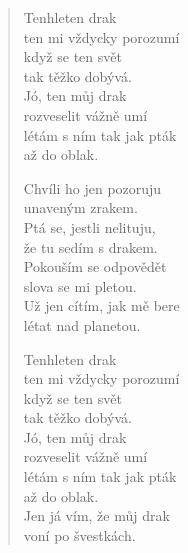 \begin{multicols}{3}
\begin{verse}
Tenhleten drak\\
ten mi vždycky porozumí\\
když se ten svět\\
tak těžko dobývá.\\
Jó, ten můj drak\\
rozveselit vážně umí\\
létám s ním tak jak pták\\
až do oblak.

Chvíli ho jen pozoruju\\
unaveným zrakem.\\
Ptá se, jestli nelituju,\\
že tu sedím s drakem.\\
Pokouším se odpovědět\\
slova se mi pletou.\\
Už jen cítím, jak mě bere\\
létat nad planetou.

Tenhleten drak\\
ten mi vždycky porozumí\\
když se ten svět\\
tak těžko dobývá.\\
Jó, ten můj drak\\
rozveselit vážně umí\\
létám s ním tak jak pták\\
až do oblak.\\
Jen já vím, že můj drak\\
voní po švestkách.
\end{verse}


\end{multicols}